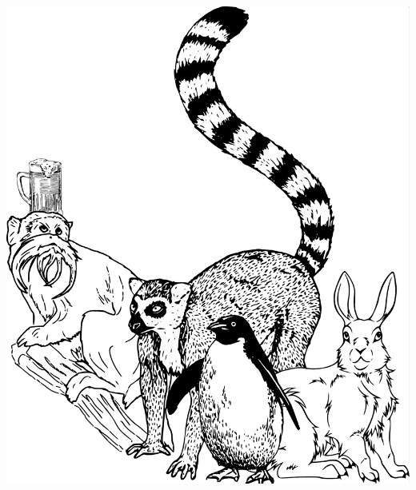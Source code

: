 \documentclass[a5paper,ngerman,xcolor=dvipsnames]{scrartcl}
\begin{document}
\vspace{2em}
\begin{center}
\includegraphics[scale=0.25]{akw.pdf}
\end{center}
\end{document}
